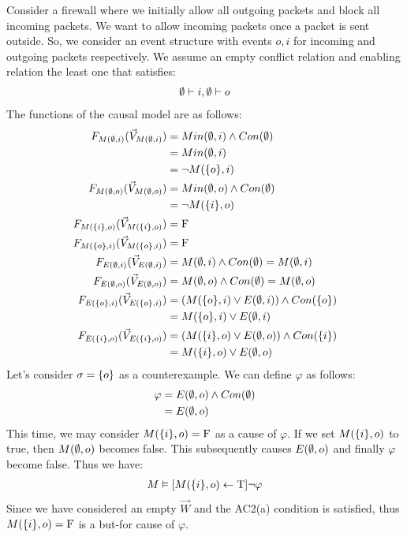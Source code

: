 \begin{example}
    Consider a firewall where we initially allow all outgoing packets and block all incoming packets.
    We want to allow incoming packets once a packet is sent outside.
    So, we consider an event structure with events $o,i$ for incoming and
    outgoing packets respectively.
    We assume an empty conflict relation and enabling relation
    the least one that satisfies:
    \begin{align*}
        \emptyset \vdash i, \emptyset \vdash o
    \end{align*}
    The functions of the causal model are as follows:
    \begin{align*}
        F_{M(\emptyset,i)}(\vec V_{M(\emptyset,i)})    & = Min(\emptyset,i) \wedge Con(\emptyset)               \\
                       & = Min(\emptyset,i)                              \\
                       & = \neg M(\{o\},i)                        \\
        F_{M(\emptyset,o)}(\vec V_{M(\emptyset,o)})    & = Min(\emptyset,o) \wedge Con(\emptyset)               \\
                       & = \neg M(\{i\},o)                        \\
        F_{M(\{i\},o)}(\vec V_{M(\{i\},o)}) & = \mathrm{F}                                     \\
        F_{M(\{o\},i)}(\vec V_{M(\{o\},i)}) & = \mathrm{F}                                     \\
        F_{E(\emptyset,i)}(\vec V_{E(\emptyset,i)})    & = M(\emptyset,i) \wedge Con(\emptyset) = M(\emptyset,i)       \\
        F_{E(\emptyset,o)}(\vec V_{E(\emptyset,o)})    & = M(\emptyset,o) \wedge Con(\emptyset) = M(\emptyset,o)       \\
        F_{E(\{o\},i)}(\vec V_{E(\{o\},i)}) & =
        \left( M(\{o\},i) \vee E(\emptyset,i)  \right) \wedge Con(\{o\}) \\
                       & = M(\{o\},i) \vee E(\emptyset,i)                \\
        F_{E(\{i\},o)}(\vec V_{E(\{i\},o)}) & =
        \left( M(\{i\},o) \vee E(\emptyset,o) \right)
        \wedge Con(\{i\})                                         \\
                       & = M(\{i\},o) \vee E(\emptyset,o)                \\
    \end{align*}
    Let's consider $\sigma = \{o\}$ as a counterexample.
    We can define $\varphi$ as follows:
    \begin{align*}
        \varphi & = E(\emptyset,o) \wedge Con(\emptyset) \\
                & = E(\emptyset,o)
    \end{align*}
    This time, we may consider $M(\{i\},o) = \mathrm{F}$ as a cause of $\varphi$.
    If we set $M(\{i\},o)$ to true, then $M(\emptyset,o)$ becomes false.
    This subsequently causes $E(\emptyset,o)$ and finally $\varphi$ become false.
    Thus we have:
    \begin{align*}
        M \vDash [M(\{i\},o) \leftarrow \mathrm{T}] \neg \varphi
    \end{align*}
    Since we have considered an empty $\vec W$ and the AC2(a) condition
    is satisfied, thus $M(\{i\},o) = \mathrm{F}$ is a but-for cause of $\varphi$.

\end{example}

